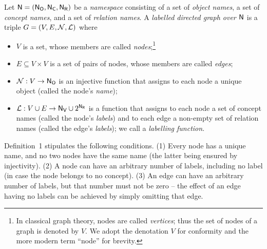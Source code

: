 \begin{definition}
  \label{def:ld_graph}
  Let $\textup{\textsf{N}}=(\mathsf{N}_\mathsf{O},\mathsf{N}_\mathsf{C},\mathsf{N}_\mathsf{R})$ be a \emph{namespace} consisting of a set \NO of \emph{object names}, a set \NC of \emph{concept names}, and a set \NR of \emph{relation names}.
  A \emph{labelled directed graph over $\textup{\textsf{N}}$} is a triple $G = (V,E,\mathcal{N},\mathcal{L})$
  where
  \begin{itemize}
    \item
      $V$ is a set, whose members are called \emph{nodes};\footnote{%
        In classical graph theory, nodes are called \emph{vertices}; thus the set of
        nodes of a graph is denoted by $V$. We adopt the denotation $V$ for conformity
        and the more modern term \enquote{node} for brevity.%
      }      
    \item 
      $E \subseteq V \times V$ is a set of pairs of nodes, whose members are called \emph{edges};
    \item
      $\mathcal{N} : V \to \mathsf{N}_\mathsf{O}$ is an injective function that assigns
      to each node a unique object (called the node's \emph{name});
    \item
      $\mathcal{L} : V \cup E \to \mathsf{N}_\mathsf{V} \cup 2^{\mathsf{N}_\mathsf{R}}$ is a function that assigns 
      to each node a set of concept names (called the node's \emph{labels}) and
      to each edge a non-empty set of relation names (called the edge's \emph{labels});
      we call \Lmc a \emph{labelling function}.
  \end{itemize}
\end{definition}
%
Definition~1 stipulates the following conditions.
%
(1) Every node has a unique name, and no two nodes have the same name (the latter being ensured by injectivity).
(2) A node can have an arbitrary number of labels, including no label (in case the node belongs to no concept).
(3) An edge can have an arbitrary number of labels, but that number must not be zero --
the effect of an edge having no labels can be achieved by simply omitting that edge.

